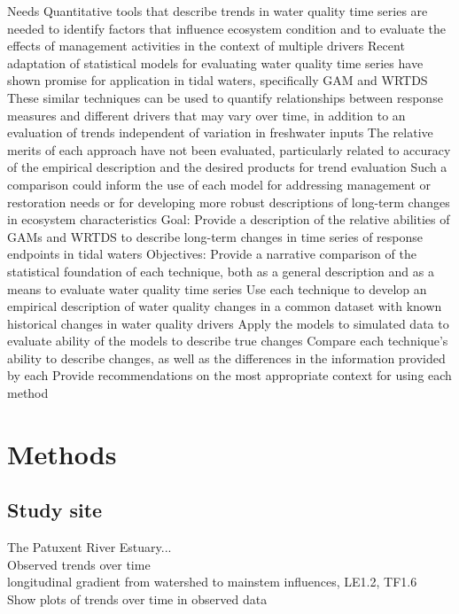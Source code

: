 \documentclass[letterpaper,12pt,oneside]{article}\usepackage[]{graphicx}\usepackage[]{color}
\begin{document}
\begin{outline}
\0 Needs
\1 Quantitative tools that describe trends in water quality time series are needed to identify factors that influence ecosystem condition and to evaluate the effects of management activities in the context of multiple drivers
\1 Recent adaptation of statistical models for evaluating water quality time series have shown promise for application in tidal waters, specifically \ac{GAM} and \ac{WRTDS}
\1 These similar techniques can be used to quantify relationships between response measures and different drivers that may vary over time, in addition to an evaluation of trends independent of variation in freshwater inputs
\1 The relative merits of each approach have not been evaluated, particularly related to accuracy of the empirical description and the desired products for trend evaluation
\1 Such a comparison could inform the use of each model for addressing management or restoration needs or for developing more robust descriptions of long-term changes in ecosystem characteristics
\0 Goal: Provide a description of the relative abilities of \acp{GAM} and \ac{WRTDS} to describe long-term changes in time series of response endpoints in tidal waters
\0 Objectives:
\1 Provide a narrative comparison of the statistical foundation of each technique, both as a general description and as a means to evaluate water quality time series
\1 Use each technique to develop an empirical description of water quality changes in a common dataset with known historical changes in water quality drivers
\1 Apply the models to simulated data to evaluate ability of the models to describe true changes
\1 Compare each technique's ability to describe changes, as well as the differences in the information provided by each
\1 Provide recommendations on the most appropriate context for using each method
\end{outline}

\section{Methods}

\subsection{Study site}

The Patuxent River Estuary... \\
Observed trends over time \\
longitudinal gradient from watershed to mainstem influences, LE1.2, TF1.6\\
Show plots of trends over time in observed data \\
\end{document}
